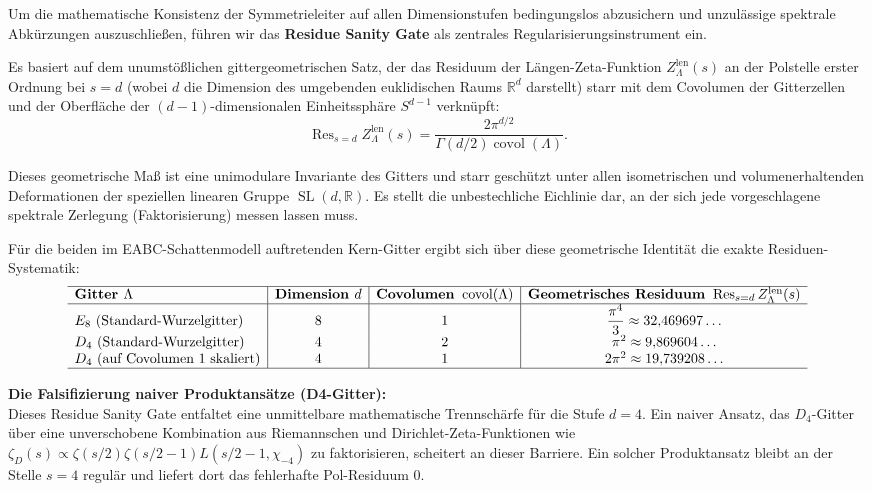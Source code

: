 \documentclass[11pt,a4paper]{article}
\theoremstyle{definition}
\begin{document}
	Um die mathematische Konsistenz der Symmetrieleiter auf allen Dimensionstufen bedingungslos abzusichern und unzulässige spektrale Abkürzungen auszuschließen, führen wir das \textbf{Residue Sanity Gate} als zentrales Regularisierungsinstrument ein.
	
	Es basiert auf dem unumstößlichen gittergeometrischen Satz, der das Residuum der Längen-Zeta-Funktion $Z_\Lambda^{\mathrm{len}}(s)$ an der Polstelle erster Ordnung bei $s = d$ (wobei $d$ die Dimension des umgebenden euklidischen Raums $\mathbb{R}^d$ darstellt) starr mit dem Covolumen der Gitterzellen und der Oberfläche der $(d-1)$-dimensionalen Einheitssphäre $S^{d-1}$ verknüpft:
	\begin{equation}
		\label{eq:residue_sanity_gate}
		\operatorname{Res}_{s=d} Z_\Lambda^{\mathrm{len}}(s) = \frac{2\pi^{d/2}}{\Gamma(d/2)\operatorname{covol}(\Lambda)}.
	\end{equation}
	
	Dieses geometrische Maß ist eine unimodulare Invariante des Gitters und starr geschützt unter allen isometrischen und volumenerhaltenden Deformationen der speziellen linearen Gruppe $\operatorname{SL}(d,\mathbb{R})$. Es stellt die unbestechliche Eichlinie dar, an der sich jede vorgeschlagene spektrale Zerlegung (Faktorisierung) messen lassen muss. 
	
	Für die beiden im EABC-Schattenmodell auftretenden Kern-Gitter ergibt sich über diese geometrische Identität die exakte Residuen-Systematik:
	\begin{equation}
		\begin{array}{l|c|c|c}
			\hline
			\textbf{Gitter } \Lambda & \textbf{Dimension } d & \textbf{Covolumen } \operatorname{covol}(\Lambda) & \textbf{Geometrisches Residuum } \operatorname{Res}_{s=d} Z_\Lambda^{\mathrm{len}}(s) \\
			\hline
			E_8 \text{ (Standard-Wurzelgitter)} & 8 & 1 & \dfrac{\pi^4}{3} \approx 32{,}469697\dots \\
			D_4 \text{ (Standard-Wurzelgitter)} & 4 & 2 & \pi^2 \approx 9{,}869604\dots \\
			D_4 \text{ (auf Covolumen 1 skaliert)} & 4 & 1 & 2\pi^2 \approx 19{,}739208\dots \\
			\hline
		\end{array}
	\end{equation}
	
	\noindent \textbf{Die Falsifizierung naiver Produktansätze (D4-Gitter):} \\
	Dieses Residue Sanity Gate entfaltet eine unmittelbare mathematische Trennschärfe für die Stufe $d=4$. Ein naiver Ansatz, das $D_4$-Gitter über eine unverschobene Kombination aus Riemannschen und Dirichlet-Zeta-Funktionen wie $\zeta_D(s) \propto \zeta(s/2)\zeta(s/2-1)L(s/2-1, \chi_{-4})$ zu faktorisieren, scheitert an dieser Barriere. Ein solcher Produktansatz bleibt an der Stelle $s=4$ regulär und liefert dort das fehlerhafte Pol-Residuum $0$. 
	
\end{document}
